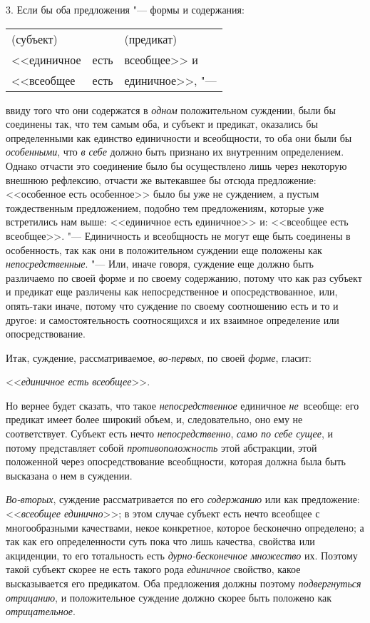 3. Если бы оба предложения "--- формы и содержания:\label{bkm:bm34a}

\begin{center}
\begin{tabular}{l c l}
(субъект) & \  & (предикат) \\
<<единичное & есть & всеобщее>> и \\
<<всеобщее & есть & единичное>>, "---
\end{tabular}
\end{center}

\noindent ввиду того что они содержатся в {\em одном} положительном
суждении, были бы соединены так, что тем самым оба, и субъект и предикат,
оказались бы определенными как единство единичности и всеобщности, то оба
они были бы {\em особенными}, что {\em в себе}
должно быть признано их внутренним определением. Однако
отчасти это соединение было бы осуществлено лишь через некоторую внешнюю
рефлексию, отчасти же вытекавшее бы отсюда предложение: <<особенное есть
особенное>> было бы уже не суждением, а пустым тождественным предложением,
подобно тем предложениям, которые уже встретились нам выше: <<единичное есть
единичное>> и: <<всеобщее есть всеобщее>>. "--- Единичность и
всеобщность не могут еще быть соединены в особенность, так как они в
положительном суждении еще положены как {\em непосредственные}. "---
Или, иначе говоря, суждение еще должно быть различаемо по
своей форме и по своему содержанию, потому что как раз субъект и предикат
еще различены как непосредственное и опосредствованное, или, опять-таки
иначе, потому что суждение по своему соотношению есть и то и другое: и
самостоятельность соотносящихся и их взаимное определение или опосредствование.

Итак, суждение, рассматриваемое, {\em во-первых}, по своей {\em форме}, гласит:

<<{\em единичное есть всеобщее}>>.

Но вернее будет сказать, что такое {\em непосредственное} единичное
{\em не}~всеобще: его предикат имеет более широкий объем, и,
следовательно, оно ему не соответствует. Субъект есть нечто
{\em непосредственно}, {\em само по себе сущее}, и потому представляет собой
{\em противоположность} этой абстракции, этой положенной через опосредствование
всеобщности, которая должна была быть высказана о нем в суждении.

{\em Во-вторых}, суждение рассматривается по его {\em содержанию}
или как предложение: <<{\em всеобщее единично}>>;
в этом случае субъект есть нечто всеобщее с многообразными
качествами, некое конкретное, которое бесконечно определено; а так как его
определенности суть пока что лишь качества, свойства или акциденции, то его
тотальность есть {\em дурно-бесконечное
множество} их. Поэтому такой субъект скорее не есть такого рода {\em единичное}
свойство, какое высказывается его предикатом. Оба предложения
должны поэтому {\em подвергнуться
отрицанию}, и положительное суждение должно скорее быть
положено как {\em отрицательное}.


